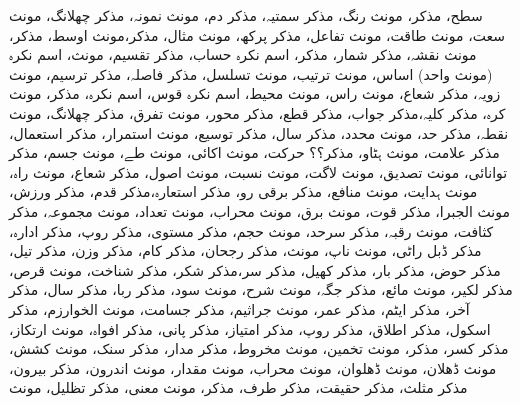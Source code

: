 سطح، مذکر، مونث
رنگ، مذکر
سمتیہ، مذکر
دم، مونث
نمونہ، مذکر
چھلانگ، مونث
سعت، مونث
طاقت، مونث
تفاعل، مذکر
پرکھ، مونث
مثال، مذکر،مونث
اوسط، مذکر، مونث
نقشہ، مذکر
شمار، مذکر، اسم نکرہ
حساب، مذکر
تقسیم، مونث، اسم نکرہ (مونث واحد)
اساس، مونث
ترتیب، مونث
تسلسل، مذکر
فاصلہ، مذکر
ترسیم، مونث
زویہ، مذکر
شعاع، مونث
راس، مونث
محیط، اسم نکرہ
قوس، اسم نکرہ، مذکر، مونث
کرہ، مذکر
کلیہ،مذکر
جواب، مذکر
قطع، مذکر
محور، مونث
تفرق، مذکر
چھلانگ، مونث
نقطہ، مذکر
حد، مونث
محدد، مذکر
سال، مذکر
توسیع، مونث
استمرار، مذکر
استعمال، مذکر
علامت، مونث
ہٹاو، مذکر؟؟
حرکت، مونث
اکائی، مونث
طے، مونث
جسم، مذکر
توانائی، مونث
تصدیق، مونث
لاگت، مونث
نسبت، مونث
اصول، مذکر
شعاع، مونث
راہ، مونث
ہدایت، مونث
منافع، مذکر
برقی رو، مذکر
استعارہ،مذکر
قدم، مذکر
ورزش، مونث
الجبرا، مذکر
قوت، مونث
برق، مونث
محراب، مونث
تعداد، مونث
مجموعہ، مذکر
کثافت، مونث
رقبہ، مذکر
سرحد، مونث
حجم، مذکر
مستوی، مذکر
روپ، مذکر
ادارہ، مذکر
ڈبل راٹی، مونث
ناپ، مونث، مذکر
رجحان، مذکر
کام، مذکر
وزن، مذکر
تیل، مذکر
حوض، مذکر
بار، مذکر
کھیل، مذکر
سر،مذکر
شکر، مذکر
شناخت، مونث
 قرص، مذکر
لکیر، مونث
مائع، مذکر
جگہ، مونث
شرح، مونث
سود، مذکر
ربا، مذکر
سال، مذکر
آخر، مذکر
ایٹم، مذکر
عمر، مونث
جراثیم، مذکر
جسامت، مونث
الخوارزم، مذکر
اسکول، مذکر
اطلاق، مذکر
روپ، مذکر
امتیاز، مذکر
پانی، مذکر
افواہ، مونث
ارتکاز، مذکر
کسر، مذکر، مونث
تخمین، مونث
مخروط، مذکر
مدار، مذکر
سنک، مونث
کشش، مونث
ڈھلان، مونث
ڈھلوان، مونث
محراب، مونث
مقدار، مونث
اندرون، مذکر
بیرون، مذکر
مثلث، مذکر
حقیقت، مذکر
طرف، مذکر، مونث
معنی، مذکر
تظلیل، مونث

